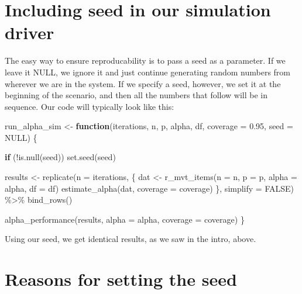 \documentclass[
]{book}
\newenvironment{Shaded}{\begin{snugshade}}{\end{snugshade}}
\newcommand{\AttributeTok}[1]{\textcolor[rgb]{0.77,0.63,0.00}{#1}}
\newcommand{\ConstantTok}[1]{\textcolor[rgb]{0.00,0.00,0.00}{#1}}
\newcommand{\ControlFlowTok}[1]{\textcolor[rgb]{0.13,0.29,0.53}{\textbf{#1}}}
\newcommand{\FloatTok}[1]{\textcolor[rgb]{0.00,0.00,0.81}{#1}}
\newcommand{\FunctionTok}[1]{\textcolor[rgb]{0.00,0.00,0.00}{#1}}
\newcommand{\NormalTok}[1]{#1}
\newcommand{\OtherTok}[1]{\textcolor[rgb]{0.56,0.35,0.01}{#1}}
\newcommand{\SpecialCharTok}[1]{\textcolor[rgb]{0.00,0.00,0.00}{#1}}
\begin{document}
\hypertarget{including-seed-in-our-simulation-driver}{%
\section{Including seed in our simulation driver}\label{including-seed-in-our-simulation-driver}}

The easy way to ensure reproducability is to pass a seed as a parameter.
If we leave it NULL, we ignore it and just continue generating random numbers from wherever we are in the system.
If we specify a seed, however, we set it at the beginning of the scenario, and then all the numbers that follow will be in sequence.
Our code will typically look like this:

\begin{Shaded}
\begin{Highlighting}[]
\NormalTok{run\_alpha\_sim }\OtherTok{\textless{}{-}} \ControlFlowTok{function}\NormalTok{(iterations, n, p, alpha, df, }\AttributeTok{coverage =} \FloatTok{0.95}\NormalTok{, }\AttributeTok{seed =} \ConstantTok{NULL}\NormalTok{) \{}
  
  \ControlFlowTok{if}\NormalTok{ (}\SpecialCharTok{!}\FunctionTok{is.null}\NormalTok{(seed)) }\FunctionTok{set.seed}\NormalTok{(seed)}

\NormalTok{  results }\OtherTok{\textless{}{-}} 
    \FunctionTok{replicate}\NormalTok{(}\AttributeTok{n =}\NormalTok{ iterations, \{}
\NormalTok{      dat }\OtherTok{\textless{}{-}} \FunctionTok{r\_mvt\_items}\NormalTok{(}\AttributeTok{n =}\NormalTok{ n, }\AttributeTok{p =}\NormalTok{ p, }\AttributeTok{alpha =}\NormalTok{ alpha, }\AttributeTok{df =}\NormalTok{ df)}
      \FunctionTok{estimate\_alpha}\NormalTok{(dat, }\AttributeTok{coverage =}\NormalTok{ coverage)}
\NormalTok{    \}, }\AttributeTok{simplify =} \ConstantTok{FALSE}\NormalTok{) }\SpecialCharTok{\%\textgreater{}\%}
    \FunctionTok{bind\_rows}\NormalTok{()}
  
  \FunctionTok{alpha\_performance}\NormalTok{(results, }\AttributeTok{alpha =}\NormalTok{ alpha, }\AttributeTok{coverage =}\NormalTok{ coverage)}
\NormalTok{\}}
\end{Highlighting}
\end{Shaded}

Using our seed, we get identical results, as we saw in the intro, above.

\hypertarget{reasons-for-setting-the-seed}{%
\section{Reasons for setting the seed}\label{reasons-for-setting-the-seed}}
\end{document}
